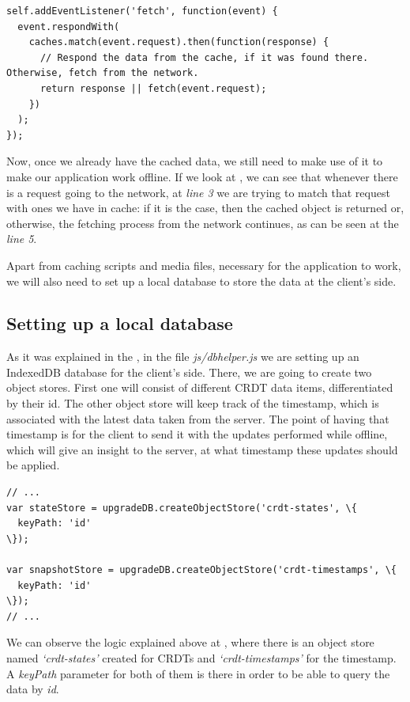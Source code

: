 \begin{lstlisting}[caption={Code for maintaining the requests of the application.}, label={lst:dev5}]
self.addEventListener('fetch', function(event) {
  event.respondWith(
    caches.match(event.request).then(function(response) {
      // Respond the data from the cache, if it was found there. Otherwise, fetch from the network.
      return response || fetch(event.request);
    })
  );
});
\end{lstlisting}

Now, once we already have the cached data, we still need to make use of it to make our application work offline. If we look at , we can see that whenever there is a request going to the network, at \textit{line 3} we are trying to match that request with ones we have in cache: if it is the case, then the cached object is returned or, otherwise, the fetching process from the network continues, as can be seen at the \textit{line 5}.

Apart from caching scripts and media files, necessary for the application to work, we will also need to set up a local database to store the data at the client's side.

\subsection*{Setting up a local database}

As it was explained in the , in the file \textit{js/dbhelper.js} we are setting up an IndexedDB database for the client's side. There, we are going to create two object stores. First one will consist of different CRDT data items, differentiated by their id. The other object store will keep track of the timestamp, which is associated with the latest data taken from the server. The point of having that timestamp is for the client to send it with the updates performed while offline, which will give an insight to the server, at what timestamp these updates should be applied.

\begin{lstlisting}[caption={Creating object stores in IndexedDB for CRDTs and timestamps.}, label={lst:dev6}]
// ...
var stateStore = upgradeDB.createObjectStore('crdt-states', \{
  keyPath: 'id'
\});

var snapshotStore = upgradeDB.createObjectStore('crdt-timestamps', \{
  keyPath: 'id'
\});
// ...
\end{lstlisting}

We can observe the logic explained above at , where there is an object store named \textit{`crdt-states'} created for CRDTs and \textit{`crdt-timestamps'} for the timestamp. A \textit{keyPath} parameter for both of them is there in order to be able to query the data by \textit{id}.

